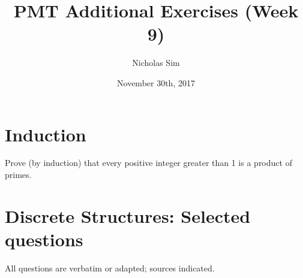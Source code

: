 \documentclass[10pt,a4paper]{article}
\begin{document}
\title{PMT Additional Exercises (Week 9)}
\author{Nicholas Sim}
\date{November 30th, 2017}
\maketitle{}


\section{Induction}
Prove (by induction) that every positive integer greater than 1 is a product of primes.

\section{Discrete Structures: Selected questions}
All questions are verbatim or adapted; sources indicated.
\end{document}

